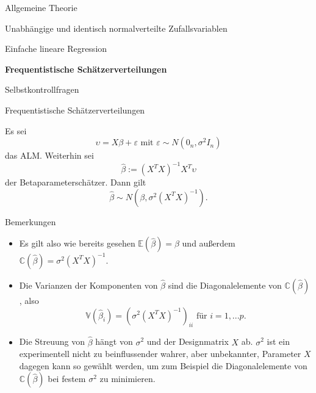 \documentclass[
  8pt,
  ignorenonframetext,
]{beamer}
\providecommand{\tightlist}{%
  \setlength{\itemsep}{0pt}\setlength{\parskip}{0pt}}
\begin{document}
\begin{frame}{}
\protect\hypertarget{section-11}{}
\large
{}
\vfill

Allgemeine Theorie

Unabhängige und identisch normalverteilte Zufallsvariablen

Einfache lineare Regression

\textbf{Frequentistische Schätzerverteilungen}

Selbstkontrollfragen \vfill
\end{frame}

\begin{frame}{Frequentistische Schätzerverteilungen}
\protect\hypertarget{frequentistische-schuxe4tzerverteilungen}{}
\footnotesize
\begin{theorem}
\justifying
\normalfont
Es sei
\begin{equation}
\upsilon = X\beta + \varepsilon \mbox{ mit } \varepsilon \sim N(0_n,\sigma^2I_n)
\end{equation}
das ALM. Weiterhin sei
\begin{equation}
\hat{\beta} := \left(X^TX\right)^{-1}X^T\upsilon
\end{equation}
der Betaparameterschätzer. Dann gilt
\begin{equation}
\hat{\beta} \sim N\left(\beta,\sigma^2(X^T X)^{-1}\right).
\end{equation}
\end{theorem}

Bemerkungen

\begin{itemize}
\tightlist
\item
  \justifying Es gilt also wie bereits gesehen
  \(\mathbb{E}(\hat{\beta}) = \beta\) und außerdem
  \(\mathbb{C}(\hat{\beta}) = \sigma^2(X^TX)^{-1}\).
\item
  Die Varianzen der Komponenten von \(\hat{\beta}\) sind die
  Diagonalelemente von \(\mathbb{C}(\hat{\beta})\), also
  \begin{equation}
  \mathbb{V}(\hat{\beta}_i) = (\sigma^2(X^TX)^{-1})_{ii} \mbox{ für } i = 1,...p.
  \end{equation}
\item
  Die Streuung von \(\hat{\beta}\) hängt von \(\sigma^2\) und der
  Designmatrix \(X\) ab. \(\sigma^2\) ist ein experimentell nicht zu
  beinflussender wahrer, aber unbekannter, Parameter \(X\) dagegen kann
  so gewählt werden, um zum Beispiel die Diagonalelemente von
  \(\mathbb{C}(\hat{\beta})\) bei festem \(\sigma^2\) zu minimieren.
\end{itemize}
\end{frame}
\end{document}
